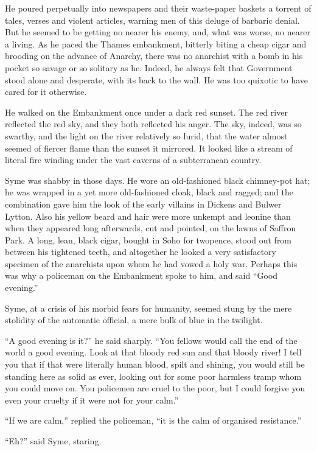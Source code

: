 He poured perpetually into newspapers and their waste-paper baskets a torrent of tales, verses and violent articles, warning men of this deluge of barbaric denial. But he seemed to be getting no nearer his enemy, and, what was worse, no nearer a living. As he paced the Thames embankment, bitterly biting a cheap cigar and brooding on the advance of Anarchy, there was no anarchist with a bomb in his pocket so savage or so solitary as he. Indeed, he always felt that Government stood alone and desperate, with its back to the wall. He was too quixotic to have cared for it otherwise.

He walked on the Embankment once under a dark red sunset. The red river reflected the red sky, and they both reflected his anger. The sky, indeed, was so swarthy, and the light on the river relatively so lurid, that the water almost seemed of fiercer flame than the sunset it mirrored. It looked like a stream of literal fire winding under the vast caverns of a subterranean country.

Syme was shabby in those days. He wore an old-fashioned black chimney-pot hat; he was wrapped in a yet more old-fashioned cloak, black and ragged; and the combination gave him the look of the early villains in Dickens and Bulwer Lytton. Also his yellow beard and hair were more unkempt and leonine than when they appeared long afterwards, cut and pointed, on the lawns of Saffron Park. A long, lean, black cigar, bought in Soho for twopence, stood out from between his tightened teeth, and altogether he looked a very satisfactory specimen of the anarchists upon whom he had vowed a holy war. Perhaps this was why a policeman on the Embankment spoke to him, and said “Good evening.”

Syme, at a crisis of his morbid fears for humanity, seemed stung by the mere stolidity of the automatic official, a mere bulk of blue in the twilight.

“A good evening is it?” he said sharply. “You fellows would call the end of the world a good evening. Look at that bloody red sun and that bloody river! I tell you that if that were literally human blood, spilt and shining, you would still be standing here as solid as ever, looking out for some poor harmless tramp whom you could move on. You policemen are cruel to the poor, but I could forgive you even your cruelty if it were not for your calm.”

“If we are calm,” replied the policeman, “it is the calm of organised resistance.”

“Eh?” said Syme, staring.

